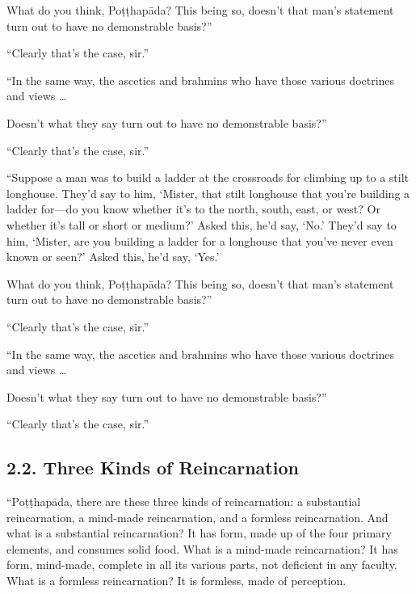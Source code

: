 \documentclass[12pt,openany]{book}%
\begin{document}
What do you think, \textsanskrit{Poṭṭhapāda}? This being so, doesn’t that man’s statement turn out to have no demonstrable basis?” 

“Clearly that’s the case, sir.” 

“In the same way, the ascetics and brahmins who have those various doctrines and views … 

Doesn’t what they say turn out to have no demonstrable basis?” 

“Clearly that’s the case, sir.” 

“Suppose a man was to build a ladder at the crossroads for climbing up to a stilt longhouse. They’d say to him, ‘Mister, that stilt longhouse that you’re building a ladder for—do you know whether it’s to the north, south, east, or west? Or whether it’s tall or short or medium?’ Asked this, he’d say, ‘No.’ They’d say to him, ‘Mister, are you building a ladder for a longhouse that you’ve never even known or seen?’ Asked this, he’d say, ‘Yes.’ 

What do you think, \textsanskrit{Poṭṭhapāda}? This being so, doesn’t that man’s statement turn out to have no demonstrable basis?” 

“Clearly that’s the case, sir.” 

“In the same way, the ascetics and brahmins who have those various doctrines and views … 

Doesn’t what they say turn out to have no demonstrable basis?” 

“Clearly that’s the case, sir.” 

\subsection*{2.2. Three Kinds of Reincarnation }

“\textsanskrit{Poṭṭhapāda}, there are these three kinds of reincarnation: a substantial reincarnation, a mind-made reincarnation, and a formless reincarnation. And what is a substantial reincarnation? It has form, made up of the four primary elements, and consumes solid food. What is a mind-made reincarnation? It has form, mind-made, complete in all its various parts, not deficient in any faculty. What is a formless reincarnation? It is formless, made of perception. 
\end{document}

